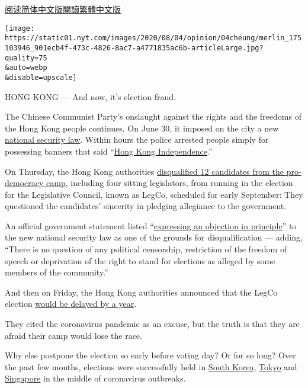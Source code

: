 \href{https://cn.nytimes.com/opinion/20200803/hong-kong-election-china/}{阅读简体中文版}\href{https://cn.nytimes.com/opinion/20200803/hong-kong-election-china/zh-hant/}{閱讀繁體中文版}

\texttt{[image: https://static01.nyt.com/images/2020/08/04/opinion/04cheung/merlin\_175103946\_901ecb4f-473c-4826-8ac7-a4771835ac6b-articleLarge.jpg?quality=75\\\&auto=webp\\\&disable=upscale]}

HONG KONG --- And now, it's election fraud.

The Chinese Communist Party's onslaught against the rights and the
freedoms of the Hong Kong people continues. On June 30, it imposed on
the city a new
\href{https://www.gld.gov.hk/egazette/pdf/20202448e/egn2020244872.pdf}{national
security law}. Within hours the police arrested people simply for
possessing banners that said
``\href{https://twitter.com/hkpoliceforce/status/1278201222457987073}{Hong
Kong Independence}.''

On Thursday, the Hong Kong authorities
\href{https://www.nytimes.com/2020/07/29/world/asia/hong-kong-arrests-security-law.html}{disqualified
12 candidates from the pro-democracy camp}, including four sitting
legislators, from running in the election for the Legislative Council,
known as LegCo, scheduled for early September: They questioned the
candidates' sincerity in pledging allegiance to the government.

An official government statement listed
``\href{https://www.info.gov.hk/gia/general/202007/30/P2020073000481.htm}{expressing
an objection in principle}'' to the new national security law as one of
the grounds for disqualification --- adding, ``There is no question of
any political censorship, restriction of the freedom of speech or
deprivation of the right to stand for elections as alleged by some
members of the community.''

And then on Friday, the Hong Kong authorities announced that the LegCo
election
\href{https://www.nytimes.com/2020/07/31/world/asia/hong-kong-election-delayed.html}{would
be delayed by a year}.

They cited the coronavirus pandemic as an excuse, but the truth is that
they are afraid their camp would lose the race.

Why else postpone the election so early before voting day? Or for so
long? Over the past few months, elections were successfully held in
\href{https://www.nytimes.com/2020/04/15/world/asia/south-korea-election.html}{South
Korea},
\href{https://www.nytimes.com/2020/07/05/world/asia/tokyo-governor-election.html}{Tokyo}
and
\href{https://www.nytimes.com/2020/07/10/world/asia/singapore-election-results.html}{Singapore}
in the middle of coronavirus outbreaks.

